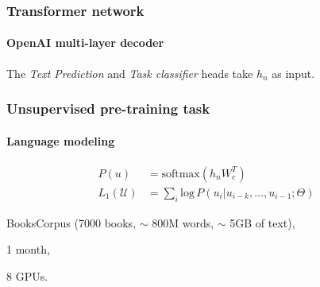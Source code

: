 \documentclass[9pt]{beamer}
\begin{document}





\begin{frame}

  \frametitle{Transformer network}

  \framesubtitle{OpenAI multi-layer decoder}

  \begin{figure}
    
  \end{figure}

  The \emph{Text Prediction} and \emph{Task classifier} heads take
  $h_{n}$ as input.
\end{frame}


\begin{frame}

  \frametitle{Unsupervised pre-training task}

  \framesubtitle{Language modeling}

  \begin{figure}
    \scalebox{0.8}{
      
    }
  \end{figure}

  \begin{align*}
    P(u) &= \text{softmax}(h_{n}W_{e}^{T})\\
    L_{1}(\mathcal{U}) &= \sum_{i} \text{log} \,P(u_{i} | u_{i - k}, \dots, u_{i - 1}; \Theta)
  \end{align*}

  \begin{description}[leftmargin=!,labelwidth=\widthof{\bfseries Hardware}]
  \item[Dataset] BooksCorpus (7000 books, $\sim$ 800M words, $\sim$ 5GB of text),
  \item[Duration] 1 month,
  \item[Hardware] 8 GPUs.
  \end{description}
\end{frame}
\end{document}
